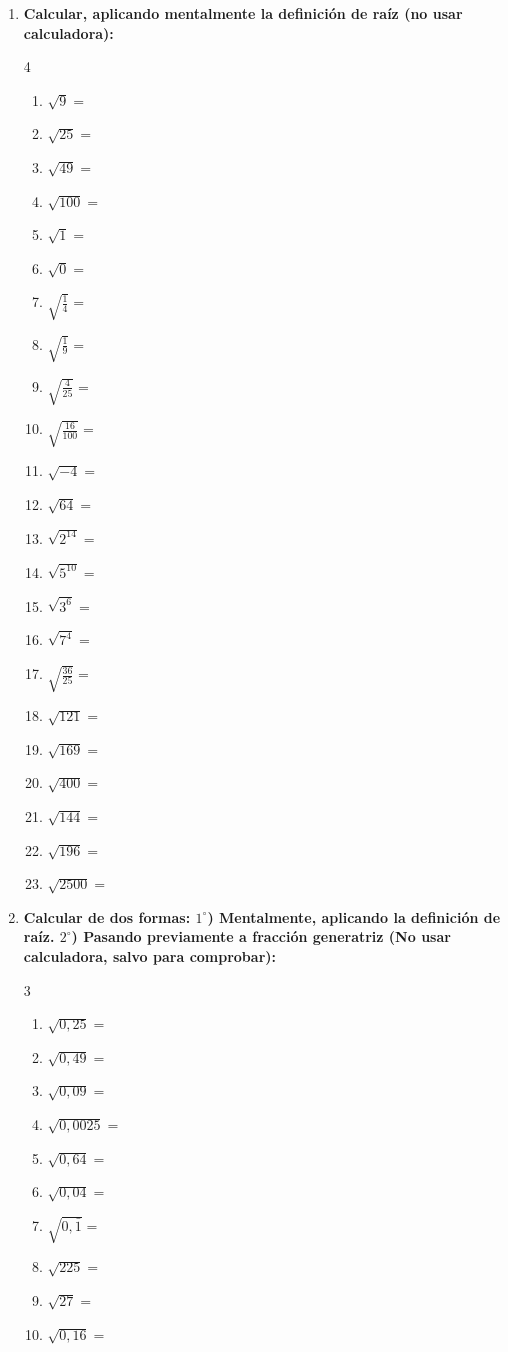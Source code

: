 \documentclass[10pt, a4paper]{article}
\begin{document}
\begin{enumerate}
    \item \textbf{Calcular, aplicando mentalmente la definición de raíz (no usar calculadora):}
    \begin{multicol}{4}
    \begin{enumerate}[label=\alph*)]
        \item $\sqrt{9} =$
        \item $\sqrt{25} =$
        \item $\sqrt{49} =$
        \item $\sqrt{100} =$
        \item $\sqrt{1} =$
        \item $\sqrt{0} =$
        \item $\sqrt{\frac{1}{4}} =$
        \item $\sqrt{\frac{1}{9}} =$
        \item $\sqrt{\frac{4}{25}} =$
        \item $\sqrt{\frac{16}{100}} =$
        \item $\sqrt{-4} =$
        \item $\sqrt{64} =$
        \item $\sqrt{2^{14}} =$
        \item $\sqrt{5^{10}} =$
        \item $\sqrt{3^6} =$
        \item $\sqrt{7^4} =$
        \item $\sqrt{\frac{36}{25}} =$
        \item $\sqrt{121} =$
        \item $\sqrt{169} =$
        \item $\sqrt{400} =$
        \item $\sqrt{144} =$
        \item $\sqrt{196} =$
        \item $\sqrt{2500} =$
    \end{enumerate}
    \end{multicol}

    \item \textbf{Calcular de dos formas: $1^\circ$) Mentalmente, aplicando la definición de raíz. $2^\circ$) Pasando previamente a fracción generatriz (No usar calculadora, salvo para comprobar):}
    \begin{multicol}{3}
    \begin{enumerate}[label=\alph*)]
        \item $\sqrt{0,25} =$
        \item $\sqrt{0,49} =$
        \item $\sqrt{0,09} =$
        \item $\sqrt{0,0025} =$
        \item $\sqrt{0,64} =$
        \item $\sqrt{0,04} =$
        \item $\sqrt{0,\bar{1}} =$
        \item $\sqrt{225} =$
        \item $\sqrt{27} =$
        \item $\sqrt{0,16} =$
    \end{enumerate}
    \end{multicol}


\end{enumerate}
\end{document}
